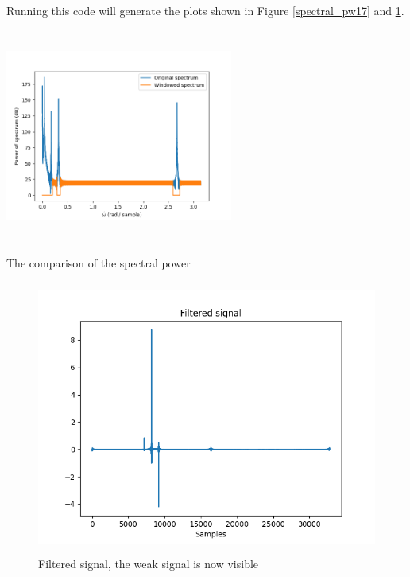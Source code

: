 \begin{enumerate}
\begin{enumerate}[a)]
                    Running this code will generate the plots shown in Figure \ref{spectral_pw17} and \ref{filtered_signal}.

                    \begin{marginfigure}
                        \centering
                        \includegraphics[width=7.5cm, height=7.0cm]{ch17/figures/spectral_pw.png}
                        \caption{The comparison of the spectral power}
                        \label{spectral_pw17}
                    \end{marginfigure}

                    \begin{figure}
                        \centering
                        \includegraphics[height=9.0cm]{ch17/figures/filtered_signal.png}
                        \caption{Filtered signal, the weak signal is now visible}
                        \label{filtered_signal}
                    \end{figure}


\end{enumerate}
\end{enumerate}
